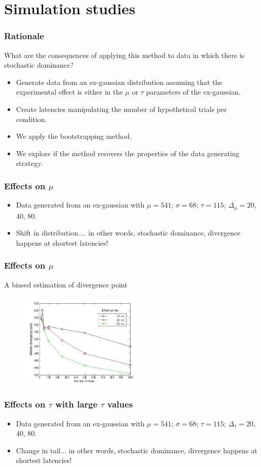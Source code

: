 \documentclass{beamer}
\begin{document}
\section{Simulation studies}
{
	\frame
	{
		\frametitle{Rationale}
		What are the consequences of applying this method to data in which there is stochastic dominance?
		\begin{itemize}
			\item Generate data from an ex-gaussian distribution assuming that the experimental effect is either in the $\mu$ or $\tau$ parameters of the ex-gaussian.
			\item Create latencies manipulating the number of hypothetical trials per condition.			
			\item We apply the bootstrapping method.
			\item We explore if the method recovers the properties of the data generating strategy.
		\end{itemize}
	}
	
	
	\frame
	{
		\frametitle{Effects on $\mu$}
			\begin{itemize}
				\item Data generated from an ex-gaussian with $\mu= 541$; $\sigma = 68$; $\tau = 115$; $\Delta_\mu = 20$, 40, 80.
				\item Shift in distribution.... in other words, stochastic dominance, divergence happens at shortest latencies!
			\end{itemize}
	}	
	\frame
	{
			
		\frametitle{Effects on $\mu$}
		A biased estimation of divergence point
		\begin{figure}[htbp] %
    			\centering
    			\includegraphics[width=2.4in]{mu-all.jpg} 
    			\label{fig:dvff}
 		\end{figure}		
	
	}
	
	
	\frame
	{
		\frametitle{Effects on $\tau$ with large $\tau$ values}
			\begin{itemize}
				\item Data generated from an ex-gaussian with  $\mu= 541$; $\sigma = 68$; $\tau = 115$; $\Delta_\tau = 20$, 40, 80.
				\item Change in tail... in other words, stochastic dominance, divergence happens at shortest latencies!


\end{itemize}}}
\end{document}
